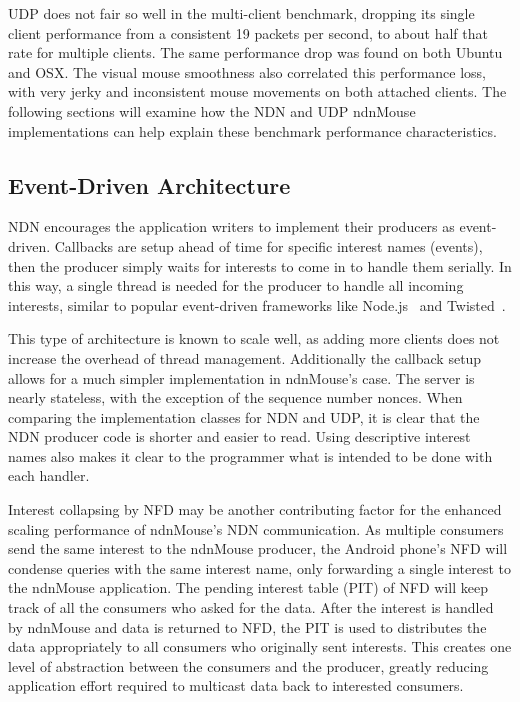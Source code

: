 \documentclass{sig-alternate}
\renewcommand\_{\textunderscore\allowbreak}  %
\begin{document}
UDP does not fair so well in the multi-client benchmark, dropping its single client performance from a consistent 19 packets per second, to about half that rate for multiple clients. The same performance drop was found on both Ubuntu and OSX. The visual mouse smoothness also correlated this performance loss, with very jerky and inconsistent mouse movements on both attached clients. The following sections will examine how the NDN and UDP ndnMouse implementations can help explain these benchmark performance characteristics.

\subsection{Event-Driven Architecture}
NDN encourages the application writers to implement their producers as event-driven. Callbacks are setup ahead of time for specific interest names (events), then the producer simply waits for interests to come in to handle them serially. In this way, a single thread is needed for the producer to handle all incoming interests, similar to popular event-driven frameworks like Node.js~\cite{nodejs} and Twisted~\cite{twisted}. 

This type of architecture is known to scale well, as adding more clients does not increase the overhead of thread management. Additionally the callback setup allows for a much simpler implementation in ndnMouse's case. The server is nearly stateless, with the exception of the sequence number nonces. When comparing the implementation classes for NDN and UDP, it is clear that the NDN producer code is shorter and easier to read. Using descriptive interest names also makes it clear to the programmer what is intended to be done with each handler.

Interest collapsing by NFD may be another contributing factor for the enhanced scaling performance of ndnMouse's NDN communication. As multiple consumers send the same interest to the ndnMouse producer, the Android phone's NFD will condense queries with the same interest name, only forwarding a single interest to the ndnMouse application. The pending interest table (PIT) of NFD will keep track of all the consumers who asked for the data. After the interest is handled by ndnMouse and data is returned to NFD, the PIT is used to distributes the data appropriately to all consumers who originally sent interests. This creates one level of abstraction between the consumers and the producer, greatly reducing application effort required to multicast data back to interested consumers. 
\end{document}
